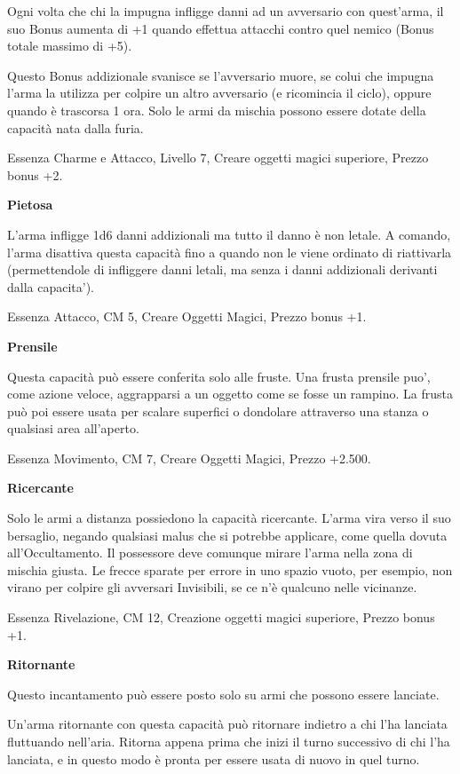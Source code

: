 \documentclass[a4paper,11pt,twoside,openany]{book}
\begin{document}
Ogni volta che chi la impugna infligge danni ad un avversario con quest'arma, il suo Bonus aumenta di +1 quando effettua attacchi contro quel nemico (Bonus totale massimo di +5).

Questo Bonus addizionale svanisce se l'avversario muore, se colui che impugna l'arma la utilizza per colpire un altro avversario (e ricomincia il ciclo), oppure quando è trascorsa 1 ora. Solo le armi da mischia possono essere dotate della capacità nata dalla furia.

Essenza Charme e Attacco, Livello 7, Creare oggetti magici superiore, Prezzo bonus +2.

\textbf{Pietosa}

L'arma infligge 1d6 danni addizionali ma tutto il danno è non letale. A comando, l'arma disattiva questa capacità fino a quando non le viene ordinato di riattivarla (permettendole di infliggere danni letali, ma senza i danni addizionali derivanti dalla capacita').

Essenza Attacco, CM 5, Creare Oggetti Magici, Prezzo bonus +1.

\textbf{Prensile}

Questa capacità può essere conferita solo alle fruste. Una frusta prensile puo', come azione veloce, aggrapparsi a un oggetto come se fosse un rampino. La frusta può poi essere usata per scalare superfici o dondolare attraverso una stanza o qualsiasi area all'aperto.

Essenza Movimento, CM 7, Creare Oggetti Magici, Prezzo +2.500.

\textbf{Ricercante}

Solo le armi a distanza possiedono la capacità ricercante. L'arma vira verso il suo bersaglio, negando qualsiasi malus che si potrebbe applicare, come quella dovuta all'Occultamento. Il possessore deve comunque mirare l'arma nella zona di mischia giusta. Le frecce sparate per errore in uno spazio vuoto, per esempio, non virano per colpire gli avversari Invisibili, se ce n'è qualcuno nelle vicinanze.

Essenza Rivelazione, CM 12, Creazione oggetti magici superiore, Prezzo bonus +1.

\textbf{Ritornante}

Questo incantamento può essere posto solo su armi che possono essere
lanciate.

Un'arma ritornante con questa capacità può ritornare indietro a chi l'ha lanciata fluttuando nell'aria. Ritorna appena prima che inizi il turno successivo di chi l'ha lanciata, e in questo modo è pronta per essere usata di nuovo in quel turno.
\end{document}
